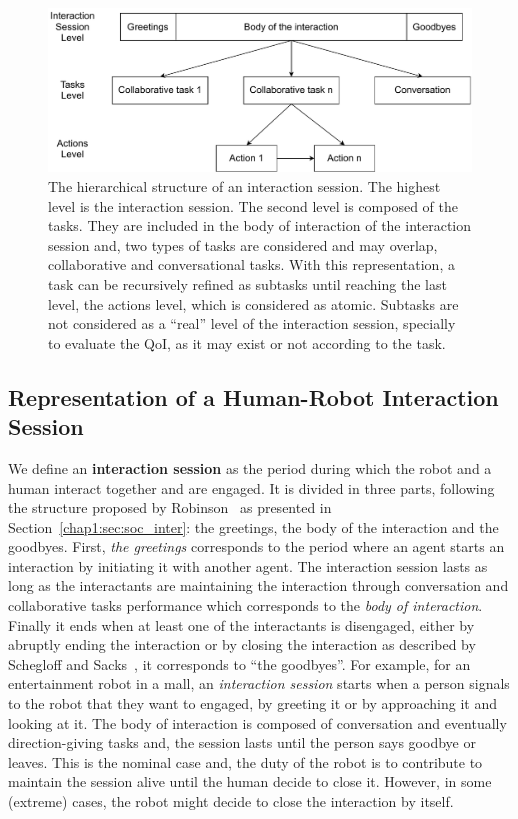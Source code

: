 \documentclass[a4paper,11pt,twoside]{StyleThese}
\begin{document}
\begin{figure}[!ht]
	\centering
	\includegraphics[width=\linewidth]{figures/chapter2/session_interaction.pdf}
	\caption{The hierarchical structure of an interaction session. The highest level is the interaction session. The second level is composed of the tasks. They are included in the body of interaction of the interaction session and, two types of tasks are considered and may overlap, collaborative and conversational tasks. With this representation, a task can be recursively refined as subtasks until reaching the last level, the actions level, which is considered as atomic. Subtasks are not considered as a ``real'' level of the interaction session, specially to evaluate the QoI, as it may exist or not according to the task.}
	\label{fig:levels}
\end{figure}


\subsection{Representation of a Human-Robot Interaction Session}
We define an \textbf{interaction session} as the period during which the robot and a human interact together and are engaged. It is divided in three parts, following the structure proposed by Robinson~\cite{robinson_overall_2012} as presented in Section~\ref{chap1:sec:soc_inter}: the greetings, the body of the interaction and the goodbyes. First, \textit{the greetings} corresponds to the period where an agent starts an interaction by initiating it with another agent. The interaction session lasts as long as the interactants are maintaining the interaction through conversation and collaborative tasks performance which corresponds to the \textit{body of interaction}. Finally it ends when at least one of the interactants is disengaged, either by abruptly ending the interaction or by closing the interaction as described by Schegloff and Sacks~\cite{schegloff_1973_opening}, it corresponds to ``the goodbyes''. For example, for an entertainment robot in a mall, an \textit{interaction session} starts when a person signals to the robot that they want to engaged, by greeting it or by approaching it and looking at it. The body of interaction is composed of conversation and eventually direction-giving tasks and, the session lasts until the person says goodbye or leaves. This is the nominal case and, the duty of the robot is to contribute to maintain the session alive until the human decide to close it. However, in some (extreme) cases, the robot might decide to close the interaction by itself.
\end{document}
